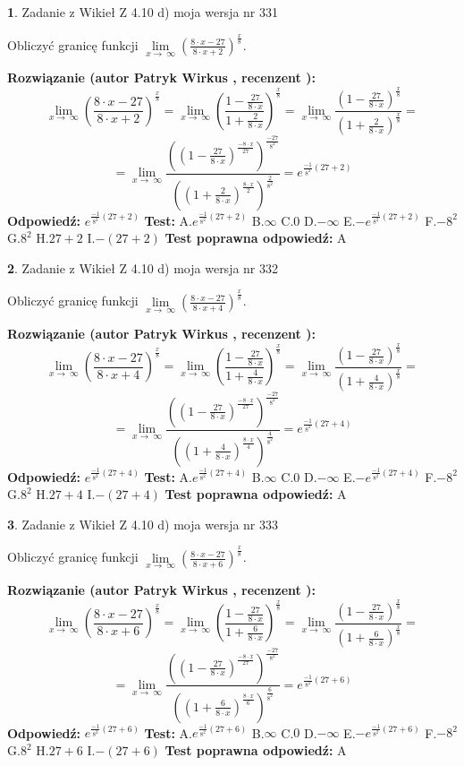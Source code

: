 \documentclass[12pt, a4paper]{article}
\theoremstyle{definition} %
\newtheorem{zad}{}
\newcommand{\zadStart}[1]{\begin{zad}#1\newline}
\newcommand{\zadStop}{\end{zad}}
\newcommand{\rozwStart}[2]{\noindent \textbf{Rozwiązanie (autor #1 , recenzent #2): }\newline}
\newcommand{\rozwStop}{\newline}
\newcommand{\odpStart}{\noindent \textbf{Odpowiedź:}\newline}
\newcommand{\odpStop}{\newline}
\newcommand{\testStart}{\noindent \textbf{Test:}\newline}
\newcommand{\testStop}{\newline}
\newcommand{\kluczStart}{\noindent \textbf{Test poprawna odpowiedź:}\newline}
\newcommand{\kluczStop}{\newline}
\begin{document}
\zadStart{Zadanie z Wikieł Z 4.10 d) moja wersja nr 331}


Obliczyć granicę funkcji  $\lim\limits_{x\to\ \infty}(\frac{8\cdot x-27}{8\cdot x+2})^{\frac{x}{8}}$.
\zadStop
\rozwStart{Patryk Wirkus}{}
$$\lim\limits_{x\to\ \infty}(\frac{8\cdot x-27}{8\cdot x+2})^{\frac{x}{8}} = \lim\limits_{x\to\ \infty}(\frac{1-\frac{27}{8\cdot x}}{1+\frac{2}{8\cdot x}})^{\frac{x}{8}}=\lim\limits_{x\to\ \infty}\frac{(1-\frac{27}{8\cdot x})^{\frac{x}{8}}}{(1+\frac{2}{8\cdot x})^{\frac{x}{8}}}=$$
$$=\lim\limits_{x\to\ \infty}\frac{((1-\frac{27}{8\cdot x})^{\frac{-8\cdot x}{27}})^{\frac{-27}{8^{2}}}}{((1+\frac{2}{8\cdot x})^{\frac{8\cdot x}{2}})^{\frac{2}{8^{2}}}}=e^{\frac{-1}{8^{2}}(27+2)}$$
\rozwStop
\odpStart
$e^{\frac{-1}{8^{2}}(27+2)}$
\odpStop
\testStart
A.$e^{\frac{-1}{8^{2}}(27+2)}$ B.$\infty$ C.$0$ D.$-\infty$ E.$-e^{\frac{-1}{8^{2}}(27+2)}$
F.$-8^{2}$ G.$8^{2}$
H.$27+2$
I.$-(27+2)$
\testStop
\kluczStart
A
\kluczStop



\zadStart{Zadanie z Wikieł Z 4.10 d) moja wersja nr 332}


Obliczyć granicę funkcji  $\lim\limits_{x\to\ \infty}(\frac{8\cdot x-27}{8\cdot x+4})^{\frac{x}{8}}$.
\zadStop
\rozwStart{Patryk Wirkus}{}
$$\lim\limits_{x\to\ \infty}(\frac{8\cdot x-27}{8\cdot x+4})^{\frac{x}{8}} = \lim\limits_{x\to\ \infty}(\frac{1-\frac{27}{8\cdot x}}{1+\frac{4}{8\cdot x}})^{\frac{x}{8}}=\lim\limits_{x\to\ \infty}\frac{(1-\frac{27}{8\cdot x})^{\frac{x}{8}}}{(1+\frac{4}{8\cdot x})^{\frac{x}{8}}}=$$
$$=\lim\limits_{x\to\ \infty}\frac{((1-\frac{27}{8\cdot x})^{\frac{-8\cdot x}{27}})^{\frac{-27}{8^{2}}}}{((1+\frac{4}{8\cdot x})^{\frac{8\cdot x}{4}})^{\frac{4}{8^{2}}}}=e^{\frac{-1}{8^{2}}(27+4)}$$
\rozwStop
\odpStart
$e^{\frac{-1}{8^{2}}(27+4)}$
\odpStop
\testStart
A.$e^{\frac{-1}{8^{2}}(27+4)}$ B.$\infty$ C.$0$ D.$-\infty$ E.$-e^{\frac{-1}{8^{2}}(27+4)}$
F.$-8^{2}$ G.$8^{2}$
H.$27+4$
I.$-(27+4)$
\testStop
\kluczStart
A
\kluczStop



\zadStart{Zadanie z Wikieł Z 4.10 d) moja wersja nr 333}


Obliczyć granicę funkcji  $\lim\limits_{x\to\ \infty}(\frac{8\cdot x-27}{8\cdot x+6})^{\frac{x}{8}}$.
\zadStop
\rozwStart{Patryk Wirkus}{}
$$\lim\limits_{x\to\ \infty}(\frac{8\cdot x-27}{8\cdot x+6})^{\frac{x}{8}} = \lim\limits_{x\to\ \infty}(\frac{1-\frac{27}{8\cdot x}}{1+\frac{6}{8\cdot x}})^{\frac{x}{8}}=\lim\limits_{x\to\ \infty}\frac{(1-\frac{27}{8\cdot x})^{\frac{x}{8}}}{(1+\frac{6}{8\cdot x})^{\frac{x}{8}}}=$$
$$=\lim\limits_{x\to\ \infty}\frac{((1-\frac{27}{8\cdot x})^{\frac{-8\cdot x}{27}})^{\frac{-27}{8^{2}}}}{((1+\frac{6}{8\cdot x})^{\frac{8\cdot x}{6}})^{\frac{6}{8^{2}}}}=e^{\frac{-1}{8^{2}}(27+6)}$$
\rozwStop
\odpStart
$e^{\frac{-1}{8^{2}}(27+6)}$
\odpStop
\testStart
A.$e^{\frac{-1}{8^{2}}(27+6)}$ B.$\infty$ C.$0$ D.$-\infty$ E.$-e^{\frac{-1}{8^{2}}(27+6)}$
F.$-8^{2}$ G.$8^{2}$
H.$27+6$
I.$-(27+6)$
\testStop
\kluczStart
A
\kluczStop
\end{document}

